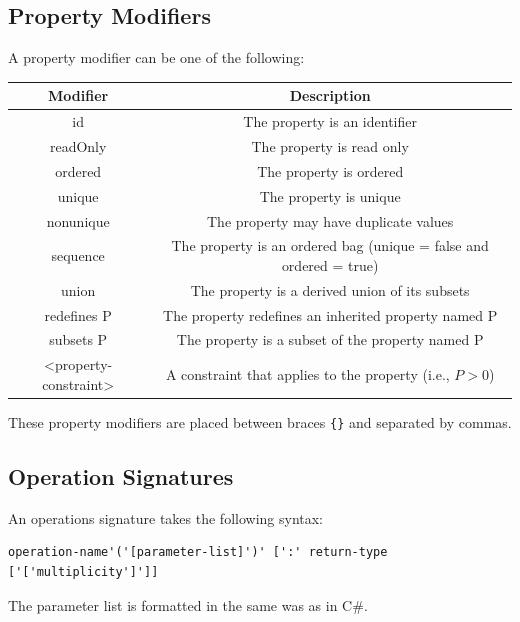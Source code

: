 \documentclass{article}
\begin{document}
\subsection{Property Modifiers}
A property modifier can be one of the following:
\begin{table}[H]
    \centering
    \begin{tabular}{c c}
        \toprule
        \textbf{Modifier}     & \textbf{Description}                                               \\
        \midrule
        id                    & The property is an identifier                                      \\
        readOnly              & The property is read only                                          \\
        ordered               & The property is ordered                                            \\
        unique                & The property is unique                                             \\
        nonunique             & The property may have duplicate values                             \\
        sequence              & The property is an ordered bag (unique = false and ordered = true) \\
        union                 & The property is a derived union of its subsets                     \\
        redefines P           & The property redefines an inherited property named P               \\
        subsets P             & The property is a subset of the property named P                   \\
        <property-constraint> & A constraint that applies to the property (i.e., \(P>0\))          \\
        \bottomrule
    \end{tabular}
\end{table}
These property modifiers are placed between braces \lstinline!{}! and separated by commas.
\subsection{Operation Signatures}
An operations signature takes the following syntax:
\begin{lstlisting}[numbers=none]
operation-name'('[parameter-list]')' [':' return-type ['['multiplicity']']]
\end{lstlisting}
The parameter list is formatted in the same was as in C\#.
\end{document}
